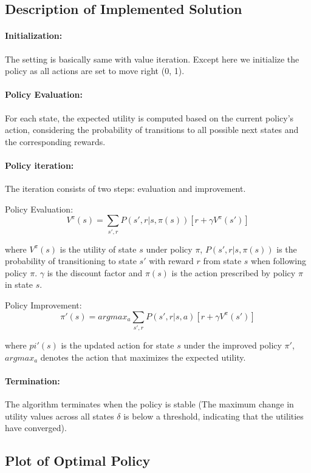\documentclass{article}
\begin{document}
\subsection{Description of Implemented Solution}

\paragraph{Initialization:} The setting is basically same with value iteration. Except here we initialize the policy as all actions are set to move right (0, 1).

\paragraph{Policy Evaluation:} For each state, the expected utility is computed based on the current policy's action, considering the probability of transitions to all possible next states and the corresponding rewards.

\paragraph{Policy iteration:} The iteration consists of two steps: evaluation and improvement.

Policy Evaluation: 
\[V^\pi (s) = \sum_{s', r} P(s', r|s, \pi(s))[r + \gamma V^\pi (s')] \]

where $V^\pi(s)$ is the utility of state $s$ under policy $\pi$, $P(s', r | s, \pi(s))$ is the probability of transitioning to state $s'$ with reward $r$ from state $s$ when following policy $\pi$. $\gamma$ is the discount factor and $\pi(s)$ is the action prescribed by policy $\pi$ in state $s$.

Policy Improvement:
\[\pi ' (s) = arg max_a \sum_{s', r} P(s', r|s, a)[r + \gamma V^\pi (s')] \]

where $pi '(s)$ is the updated action for state $s$ under the improved policy $\pi '$, $argmax_a$ denotes the action that maximizes the expected utility.

\paragraph{Termination:} The algorithm terminates when the policy is stable (The maximum change in utility values across all states $\delta$ is below a threshold, indicating that the utilities have converged).

\subsection{Plot of Optimal Policy}
\end{document}
